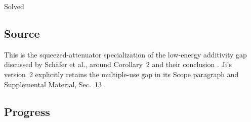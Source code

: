 Solved

\subsection*{Source}

This is the squeezed-attenuator specialization of the low-energy additivity gap discussed by Sch\"afer et al., around Corollary~2 and their conclusion . Ji's version~2 explicitly retains the multiple-use gap in its Scope paragraph and Supplemental Material, Sec.~13 .

\subsection*{Progress}

